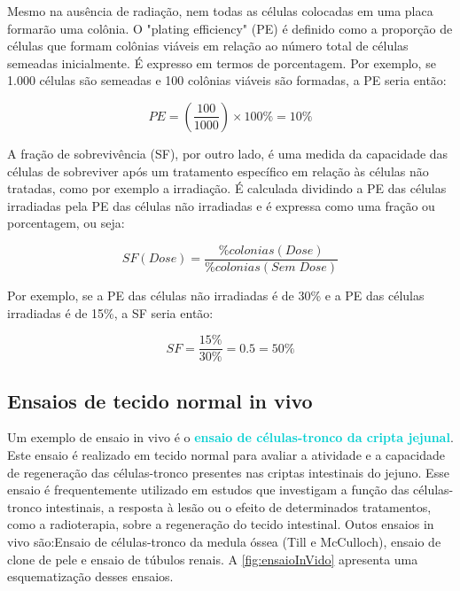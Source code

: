 \documentclass[11pt,a4paper]{article}
\newcounter{exemplo}
\begin{document}
	Mesmo na ausência de radiação, nem todas as células colocadas em uma placa formarão uma colônia. O "plating efficiency" (PE) é definido como a proporção de células que formam colônias viáveis em relação ao número total de células semeadas inicialmente. É expresso em termos de porcentagem. Por exemplo, se 1.000 células são semeadas e 100 colônias viáveis são formadas, a PE seria então:
	
		$$PE = \left(\frac{100}{1000}\right) \times 100\% = 10\%$$
	

	A fração de sobrevivência (SF), por outro lado, é uma medida da capacidade das células de sobreviver após um tratamento específico em relação às células não tratadas, como por exemplo a irradiação. É calculada dividindo a PE das células irradiadas pela PE das células não irradiadas e é expressa como uma fração ou porcentagem, ou seja:
	
		$$SF(Dose) = \frac{\%colonias (Dose)}{\%colonias (Sem \; Dose)}$$
	
	Por exemplo, se a PE das células não irradiadas é de 30\% e a PE das células irradiadas é de 15\%, a SF seria então:

		$$SF = \frac{15\%}{30\%} = 0.5 = 50\%$$
	

\subsection{Ensaios de tecido normal in vivo}

	Um exemplo de ensaio in vivo é o \textcolor{DarkTurquoise}{\textbf{ensaio de células-tronco da cripta jejunal}}. Este ensaio é realizado em tecido normal para avaliar a atividade e a capacidade de regeneração das células-tronco presentes nas criptas intestinais do jejuno. Esse ensaio é frequentemente utilizado em estudos que investigam a função das células-tronco intestinais, a resposta à lesão ou o efeito de determinados tratamentos, como a radioterapia, sobre a regeneração do tecido intestinal. Outos ensaios in vivo são:Ensaio de células-tronco da medula óssea (Till e McCulloch), ensaio de clone de pele e ensaio de túbulos renais. A \ref{fig:ensaioInVido} apresenta uma esquematização desses ensaios.
\end{document}
